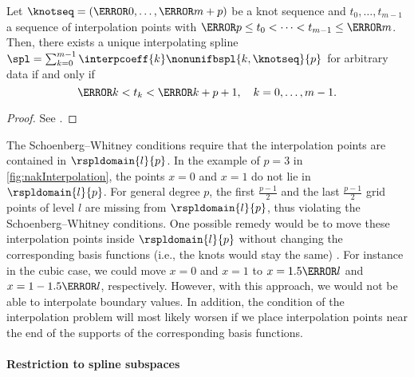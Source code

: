 \begin{proposition}
  Let $\knotseq = (\knot{0}, \dotsc, \knot{m+p})$ be a knot sequence
  and $t_0, \dotsc, t_{m-1}$ a sequence of interpolation points with
  $\knot{p} \le t_0 < \dotsb < t_{m-1} \le \knot{m}$.
  Then, there exists a unique interpolating spline
  $\spl = \sum_{k=0}^{m-1} \interpcoeff{k} \nonunifbspl{k,\knotseq}{p}$
  for arbitrary data if and only if
  \begin{equation}
    \knot{k} < t_k < \knot{k+p+1},\quad
    k = 0, \dotsc, m - 1.
  \end{equation}
\end{proposition}

\begin{proof}
  See \cite{Hoellig13Approximation}.
\end{proof}

The Schoenberg--Whitney conditions require that the interpolation points
are contained in $\rspldomain{l}{p}$.
In the example of $p = 3$ in \cref{fig:nakInterpolation},
the points $x = 0$ and $x = 1$ do not lie in~$\rspldomain{l}{p}$.
For general degree $p$, the first $\tfrac{p-1}{2}$ and the
last $\tfrac{p-1}{2}$ grid points of level $l$ are missing from $\rspldomain{l}{p}$,
thus violating the Schoenberg--Whitney conditions.
One possible remedy would be to move these interpolation points inside
$\rspldomain{l}{p}$ without changing the corresponding basis functions
(i.e., the knots would stay the same) \cite{Hoellig13Approximation}.
For instance in the cubic case, we could move $x = 0$ and $x = 1$ to
$x = 1.5 \ms{l}$ and $x = 1 - 1.5 \ms{l}$, respectively.
However, with this approach, we would not be able to interpolate
boundary values.
In addition, the condition of the interpolation problem will most likely
worsen if we place interpolation points near the end of the supports
of the corresponding basis functions.

\paragraph{Restriction to spline subspaces}

